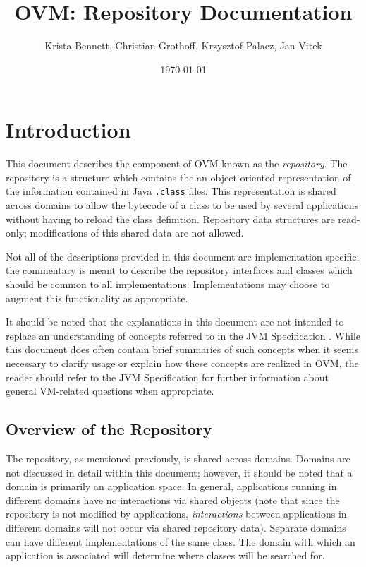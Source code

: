 \documentclass{report}
\title{OVM: Repository Documentation}
\author{Krista Bennett, Christian Grothoff, Krzysztof Palacz, Jan Vitek}
\date{\today}
\begin{document}
\maketitle
\tableofcontents
\newpage
\chapter{Introduction}
This document describes the component of OVM known as the 
{\em repository}. The repository is a structure which contains the 
an object-oriented representation of the information contained in Java 
\texttt{.class} files. This representation is shared across domains to allow 
the bytecode of a class to be used by several applications without having to 
reload the class definition. Repository data structures are read-only; 
modifications of this shared data are not allowed.

Not all of the descriptions provided in this document are implementation 
specific; the commentary is meant to describe the repository interfaces and
classes which should be common to all implementations. 
Implementations may choose to augment this functionality as appropriate.

It should be noted that the explanations in this document are not intended
to replace an understanding of concepts referred to in the JVM Specification
\cite{LindholmY96}. While this document does often contain brief summaries of 
such concepts when it seems necessary to clarify usage or explain how these 
concepts are realized in OVM, the reader should refer to the JVM Specification
for further information about general VM-related questions when appropriate.

\section{Overview of the Repository}

The repository, as mentioned previously, is shared across domains. 
Domains are not discussed in detail within this document; however, it 
should be noted that a domain is primarily an application space. In general, 
applications running in different domains have no interactions via shared 
objects (note that since the repository is not modified by applications, 
{\em interactions} between applications in different domains will not occur 
via shared repository data). Separate domains can have different 
implementations of the same class. The domain with which an application is 
associated will determine where classes will be searched for.
\end{document}
